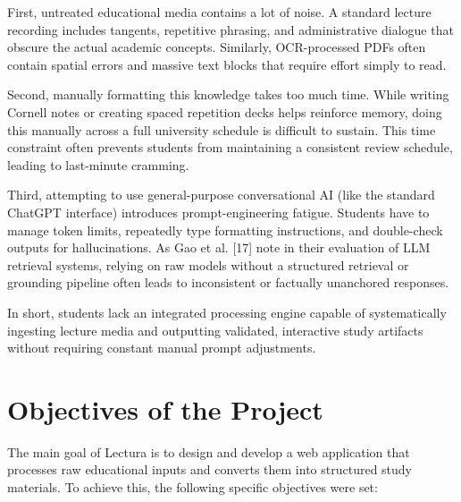 First, untreated educational media contains a lot of noise. A standard lecture recording includes tangents, repetitive phrasing, and administrative dialogue that obscure the actual academic concepts. Similarly, OCR-processed PDFs often contain spatial errors and massive text blocks that require effort simply to read.

Second, manually formatting this knowledge takes too much time. While writing Cornell notes or creating spaced repetition decks helps reinforce memory, doing this manually across a full university schedule is difficult to sustain. This time constraint often prevents students from maintaining a consistent review schedule, leading to last-minute cramming.

Third, attempting to use general-purpose conversational AI (like the standard ChatGPT interface) introduces prompt-engineering fatigue. Students have to manage token limits, repeatedly type formatting instructions, and double-check outputs for hallucinations. As Gao et al. [17] note in their evaluation of LLM retrieval systems, relying on raw models without a structured retrieval or grounding pipeline often leads to inconsistent or factually unanchored responses. 

In short, students lack an integrated processing engine capable of systematically ingesting lecture media and outputting validated, interactive study artifacts without requiring constant manual prompt adjustments.

\section{Objectives of the Project}
The main goal of Lectura is to design and develop a web application that processes raw educational inputs and converts them into structured study materials. To achieve this, the following specific objectives were set:

